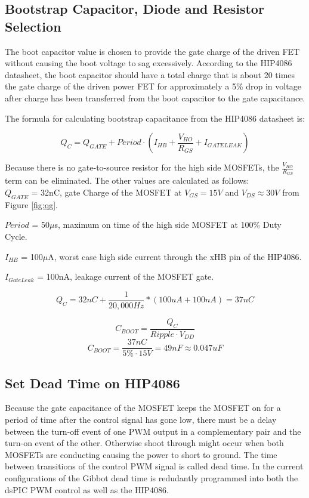 \documentclass{article}
\begin{document}
\subsection{Bootstrap Capacitor, Diode and Resistor Selection}
The boot capacitor value is chosen to provide the gate charge of the driven FET without causing the boot voltage to sag excessively. According to the HIP4086 datasheet, the boot capacitor should have a total charge that is about 20 times the gate charge of the driven power FET for approximately a 5\% drop in voltage after charge has been transferred from the boot capacitor to the gate capacitance.

The formula for calculating bootstrap capacitance from the HIP4086 datasheet is:

\[Q_C = Q_{GATE} + Period \cdot \left ( I_{HB} + \frac{V_{HO}}{R_{GS}} + I_{GATELEAK} \right )\]

Because there is no gate-to-source resistor for the high side MOSFETs, the $\frac{V_{HO}}{R_{GS}}$ term can be eliminated. The other values are calculated as follows:\\

$Q_{GATE}$ = 32nC, gate Charge of the MOSFET at $V_{GS}=15V$ and $V_{DS} \approx 30V$ from Figure \ref{fig:qg}.

$Period$ = 50$\mu$s, maximum on time of the high side MOSFET at 100\% Duty Cycle.

$I_{HB}$ = 100$\mu$A, worst case high side current through the xHB pin of the HIP4086.

$I_{GateLeak}$ = 100nA, leakage current of the MOSFET gate.

\[Q_C = 32nC + \frac{1}{20,000Hz}*(100uA + 100 nA) = 37nC\]

\[C_{BOOT} = \frac{Q_C}{Ripple \cdot V_{DD}} \]
\[C_{BOOT} = \frac{37nC}{5\% \cdot 15V} = 49nF \approx 0.047uF\]


\subsection{Set Dead Time on HIP4086}
Because the gate capacitance of the MOSFET keeps the MOSFET on for a period of time after the control signal has gone low, there must be a delay between the turn-off event of one PWM
output in a complementary pair and the turn-on event of the other. Otherwise shoot through might occur when both MOSFETs are conducting causing the power to short to ground. The time between transitions of the control PWM signal is called dead time. In the current configurations of the Gibbot dead time is redudantly programmed into both the dsPIC PWM control as well as the HIP4086. 
\end{document}
